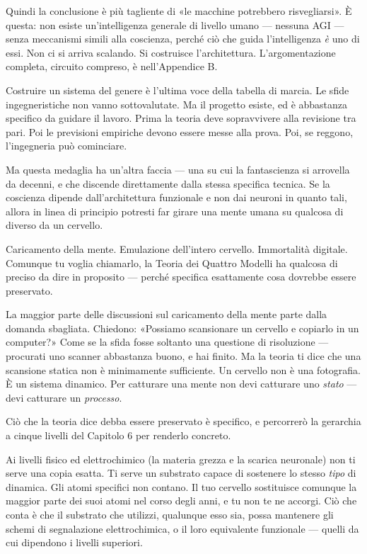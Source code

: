 \documentclass[11pt, twoside, openright]{book}
\begin{document}
Quindi la conclusione è più tagliente di «le macchine potrebbero risvegliarsi». È questa: non esiste un'intelligenza generale di livello umano --- nessuna AGI --- senza meccanismi simili alla coscienza, perché ciò che guida l'intelligenza \textit{è} uno di essi. Non ci si arriva scalando. Si costruisce l'architettura. L'argomentazione completa, circuito compreso, è nell'Appendice B.

Costruire un sistema del genere è l'ultima voce della tabella di marcia. Le sfide ingegneristiche non vanno sottovalutate. Ma il progetto esiste, ed è abbastanza specifico da guidare il lavoro. Prima la teoria deve sopravvivere alla revisione tra pari. Poi le previsioni empiriche devono essere messe alla prova. Poi, se reggono, l'ingegneria può cominciare.


Ma questa medaglia ha un'altra faccia --- una su cui la fantascienza si arrovella da decenni, e che discende direttamente dalla stessa specifica tecnica. Se la coscienza dipende dall'architettura funzionale e non dai neuroni in quanto tali, allora in linea di principio potresti far girare una mente umana su qualcosa di diverso da un cervello.

Caricamento della mente. Emulazione dell'intero cervello. Immortalità digitale. Comunque tu voglia chiamarlo, la Teoria dei Quattro Modelli ha qualcosa di preciso da dire in proposito --- perché specifica esattamente cosa dovrebbe essere preservato.

La maggior parte delle discussioni sul caricamento della mente parte dalla domanda sbagliata. Chiedono: «Possiamo scansionare un cervello e copiarlo in un computer?» Come se la sfida fosse soltanto una questione di risoluzione --- procurati uno scanner abbastanza buono, e hai finito. Ma la teoria ti dice che una scansione statica non è minimamente sufficiente. Un cervello non è una fotografia. È un sistema dinamico. Per catturare una mente non devi catturare uno \textit{stato} --- devi catturare un \textit{processo}.

Ciò che la teoria dice debba essere preservato è specifico, e percorrerò la gerarchia a cinque livelli del Capitolo 6 per renderlo concreto.

Ai livelli fisico ed elettrochimico (la materia grezza e la scarica neuronale) non ti serve una copia esatta. Ti serve un substrato capace di sostenere lo stesso \textit{tipo} di dinamica. Gli atomi specifici non contano. Il tuo cervello sostituisce comunque la maggior parte dei suoi atomi nel corso degli anni, e tu non te ne accorgi. Ciò che conta è che il substrato che utilizzi, qualunque esso sia, possa mantenere gli schemi di segnalazione elettrochimica, o il loro equivalente funzionale --- quelli da cui dipendono i livelli superiori.
\end{document}
